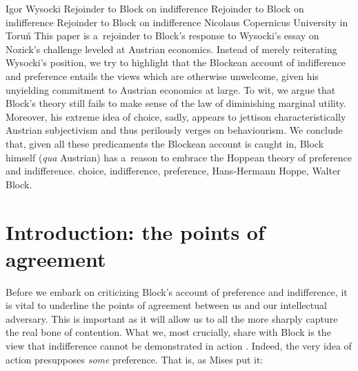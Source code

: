 \begin{artengenv}{Igor Wysocki}
	{Rejoinder to Block on indifference}
	{Rejoinder to Block on indifference}
	{Rejoinder to Block on indifference}
	{Nicolaus Copernicus University in Toruń\label{wysocki-rejoinder-firstpage}}
	{This paper is a~rejoinder to Block's
	\parencite*{block_response_2022}
	response to Wysocki's
	\parencite{wysocki_problem_2021}
	essay on Nozick's challenge leveled at Austrian economics. Instead of merely reiterating Wysocki's
		\parencite{wysocki_problem_2021}
	position, we try to highlight that the Blockean account of indifference and preference entails the views which are otherwise unwelcome, given his unyielding commitment to Austrian economics at large. To wit, we argue that Block's theory still fails to make sense of the law of diminishing marginal utility. Moreover, his extreme idea of choice, sadly, appears to jettison characteristically Austrian subjectivism and thus perilously verges on behaviourism. We conclude that, given all these predicaments the Blockean account is caught in, Block himself (\textit{qua} Austrian) has a~reason to embrace the Hoppean theory of preference and indifference.
	}
	{choice, indifference, preference, Hans-Hermann Hoppe, Walter Block.}








\section{Introduction: the points of agreement }

\lettrine[loversize=0.13,lines=2,lraise=-0.03,nindent=0em,findent=0.2pt]%
{B}{}efore we embark on criticizing Block's account of preference and indifference, it is vital to underline the points of agreement between us and our intellectual adversary. This is important as it will allow us to all the more sharply capture the real bone of contention. What we, most crucially, share with Block is the view that indifference cannot be demonstrated in action 
\parencites[see e.g.,][]{block_rejoinder_2009}[][]{rothbard_toward_1997}. %
 Indeed, the very idea of action presupposes \textit{some} preference. That is, as Mises 
\parencite*[][p.97]{mises_human_1998} %
 put it:




\end{artengenv}
